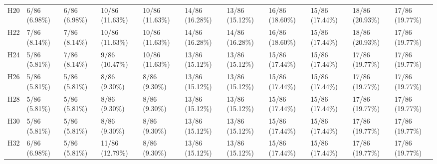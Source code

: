 \begin{table}[tbp]
\begin{tabular}{lllllllllll}
H20 & 6/86 (6.98\%) & 6/86 (6.98\%) & 10/86 (11.63\%) & 10/86 (11.63\%) & 14/86 (16.28\%) & 13/86 (15.12\%) & 16/86 (18.60\%) & 15/86 (17.44\%) & 18/86 (20.93\%) & 17/86 (19.77\%) \\
H22 & 7/86 (8.14\%) & 7/86 (8.14\%) & 10/86 (11.63\%) & 10/86 (11.63\%) & 14/86 (16.28\%) & 14/86 (16.28\%) & 16/86 (18.60\%) & 15/86 (17.44\%) & 18/86 (20.93\%) & 17/86 (19.77\%) \\
H24 & 5/86 (5.81\%) & 7/86 (8.14\%) & 9/86 (10.47\%) & 10/86 (11.63\%) & 13/86 (15.12\%) & 13/86 (15.12\%) & 15/86 (17.44\%) & 15/86 (17.44\%) & 17/86 (19.77\%) & 17/86 (19.77\%) \\
H26 & 5/86 (5.81\%) & 5/86 (5.81\%) & 8/86 (9.30\%) & 8/86 (9.30\%) & 13/86 (15.12\%) & 13/86 (15.12\%) & 15/86 (17.44\%) & 15/86 (17.44\%) & 17/86 (19.77\%) & 17/86 (19.77\%) \\
H28 & 5/86 (5.81\%) & 5/86 (5.81\%) & 8/86 (9.30\%) & 8/86 (9.30\%) & 13/86 (15.12\%) & 13/86 (15.12\%) & 15/86 (17.44\%) & 15/86 (17.44\%) & 17/86 (19.77\%) & 17/86 (19.77\%) \\
H30 & 5/86 (5.81\%) & 5/86 (5.81\%) & 8/86 (9.30\%) & 8/86 (9.30\%) & 13/86 (15.12\%) & 13/86 (15.12\%) & 15/86 (17.44\%) & 15/86 (17.44\%) & 17/86 (19.77\%) & 17/86 (19.77\%) \\
H32 & 6/86 (6.98\%) & 5/86 (5.81\%) & 11/86 (12.79\%) & 8/86 (9.30\%) & 13/86 (15.12\%) & 13/86 (15.12\%) & 15/86 (17.44\%) & 15/86 (17.44\%) & 17/86 (19.77\%) & 17/86 (19.77\%) \\
\bottomrule
\end{tabular}
\end{table}
